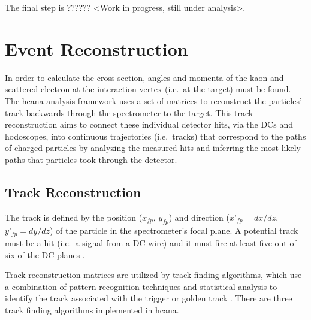 \documentclass[
]{report}
\begin{document}


The final step is ?????? \textless Work in progress, still under
analysis\textgreater.

\hypertarget{Section-5.2}{%
\section{Event Reconstruction}\label{Section-5.2}}

In order to calculate the cross section, angles and momenta of the kaon
and scattered electron at the interaction vertex (i.e.~at the target)
must be found. The hcana analysis framework uses a set of matrices to
reconstruct the particles' track backwards through the spectrometer to
the target. This track reconstruction aims to connect these individual
detector hits, via the DCs and hodoscopes, into continuous trajectories
(i.e.~tracks) that correspond to the paths of charged particles by
analyzing the measured hits and inferring the most likely paths that
particles took through the detector.

\hypertarget{track-reconstruction}{%
\subsection{Track Reconstruction}\label{track-reconstruction}}

The track is defined by the position (\(x_{fp}\), \(y_{fp}\)) and
direction (\(x’_{fp}=dx/dz\), \(y’_{fp}=dy/dz\)) of the particle in the
spectrometer's focal plane. A potential track must be a hit (i.e.~a
signal from a DC wire) and it must fire at least five out of six of the
DC planes \cite{usman_shms_2022}.

Track reconstruction matrices are utilized by track finding algorithms,
which use a combination of pattern recognition techniques and
statistical analysis to identify the track associated with the trigger
or golden track \cite{jones_track_2020}. There are three track finding
algorithms implemented in hcana.
\end{document}
